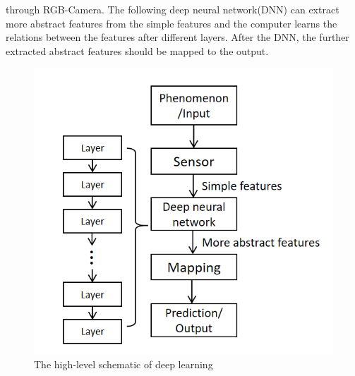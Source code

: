     through RGB-Camera. The following deep neural network(DNN) can extract more abstract features from the simple features and the computer learns the relations between 
    the features after different layers. After the DNN, the further extracted abstract features should be mapped to the output.  
    \begin{figure}
      \centering
      \includegraphics[width=0.6\linewidth]{example_images/DeepLearningSchematic}
      \caption{The high-level schematic of deep learning}
      \label{The high-level schematic of deep learning}
    \end{figure}
